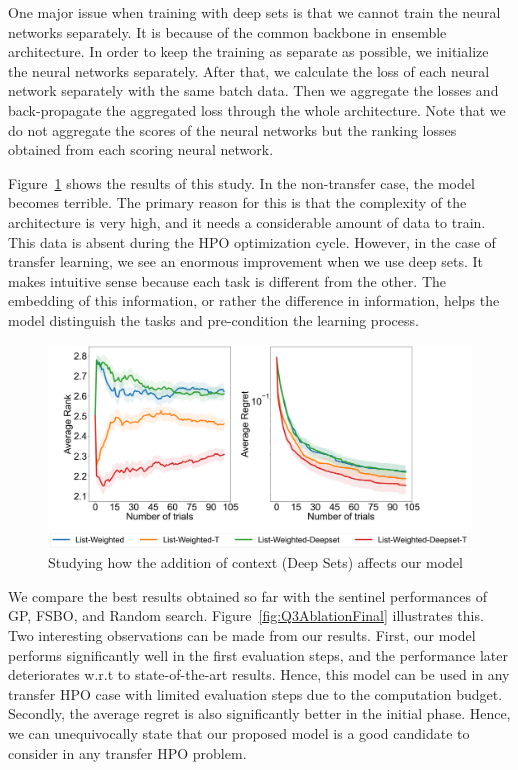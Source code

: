 \documentclass[12pt, twoside, ngerman]{report}
\begin{document}
One major issue when training with deep sets is that we cannot train the neural networks separately.
It is because of the common backbone in ensemble architecture.
In order to keep the training as separate as possible, we initialize the neural networks separately. After that, we calculate the loss of each neural network separately with the same batch data. Then we aggregate the losses and back-propagate the aggregated loss through the whole architecture. Note that we do not aggregate the scores of the neural networks but the ranking losses obtained from each scoring neural network.

Figure~\ref{fig:Q3Ablation} shows the results of this study. In the non-transfer case,  the model becomes terrible. The primary reason for this is that the complexity of the architecture is very high, and it needs a considerable amount of data to train. This data is absent during the HPO optimization cycle. However,  in the case of transfer learning,  we see an enormous improvement when we use deep sets. It makes intuitive sense because each task is different from the other. The embedding of this information, or rather the difference in information, helps the model distinguish the tasks and pre-condition the learning process. 

\begin{figure}[h]
  \centering
    \includegraphics[scale=0.25]{images/Q3Ablation}
    \caption{Studying how the addition of context (Deep Sets) affects our model}
    \label{fig:Q3Ablation}
\end{figure}

We compare the best results obtained so far with the sentinel performances of GP,  FSBO,  and Random search. Figure~\ref{fig:Q3AblationFinal} illustrates this.  Two interesting observations can be made from our results. First,  our model performs significantly well in the first evaluation steps, and the performance later deteriorates w.r.t to state-of-the-art results. Hence,  this model can be used in any transfer HPO case with limited evaluation steps due to the computation budget. Secondly,   the average regret is also significantly better in the initial phase. Hence, we can unequivocally state that our proposed model is a good candidate to consider in any transfer HPO problem. 
\end{document}
